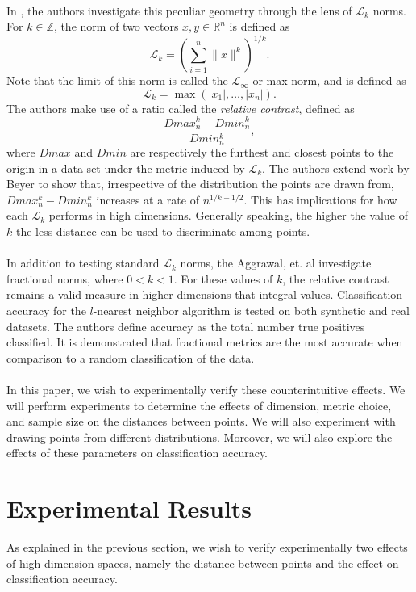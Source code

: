 \documentclass{article}
\newcommand{\Z}{\mathbb{Z}}
\newcommand{\R}{\mathbb{R}}
\begin{document}
\paragraph{}
In \cite{aggarwal2001surprising}, the authors investigate this peculiar geometry through the lens of $\mathcal{L}_k$ norms. For $k\in\Z$, the norm of two vectors $x,y\in\R^n$ is defined as
$$
\mathcal{L}_k=\left(\sum_{i=1}^n\|x\|^k\right)^{1/k}.
$$
Note that the limit of this norm is called the $\mathcal{L}_{\infty}$ or max norm, and is defined as
$$
\mathcal{L}_k=\max(|x_1|,\ldots,|x_n|).
$$
The authors make use of a ratio called the \emph{relative contrast}, defined as
$$
\dfrac{Dmax_n^k-Dmin_n^k}{Dmin_n^k},
$$
where $Dmax$ and $Dmin$ are respectively the furthest and closest points to the origin in a data set under the metric induced by $\mathcal{L}_k$. The authors extend work by Beyer\cite{beyer1999nearest} to show that, irrespective of the distribution the points are drawn from, $Dmax_n^k-Dmin_n^k$ increases at a rate of $n^{1/k-1/2}$. This has implications for how each  $\mathcal{L}_k$ performs in high dimensions. Generally speaking, the higher the value of $k$ the less distance can be used to discriminate among points.
\paragraph{}
In addition to testing standard $\mathcal{L}_k$ norms, the Aggrawal, et. al investigate fractional norms, where $0< k < 1$. For these values of $k$, the relative contrast remains a valid measure in higher dimensions that integral values. Classification accuracy for the $l$-nearest neighbor algorithm is tested on both synthetic and real datasets. The authors define accuracy as the total number true positives classified. It is demonstrated that fractional metrics are the most accurate when comparison to a random classification of the data.
\paragraph{}
In this paper, we wish to experimentally verify these counterintuitive effects. We will perform experiments to determine the effects of dimension, metric choice, and sample size on the distances between points. We will also experiment with drawing points from different distributions. Moreover, we will also explore the effects of these parameters on classification accuracy. 
\section{Experimental Results}
As explained in the previous section, we wish to verify experimentally two effects of high dimension spaces, namely the distance between points and the effect on classification accuracy. 
\end{document}
